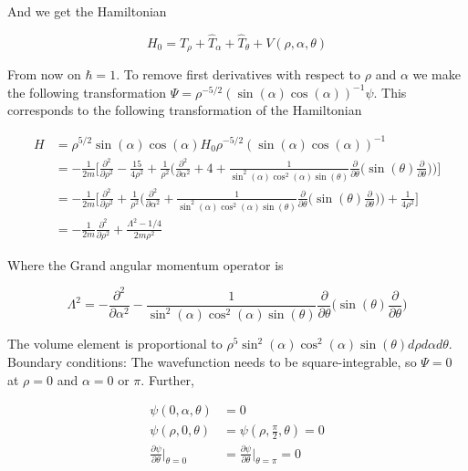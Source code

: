 \documentclass{article}
\begin{document}
And we get the Hamiltonian 

\begin{equation}
H_0 = \hat{T}_{\rho} +  \hat{T}_{\alpha}+\hat{T}_{\theta} + V(\rho,\alpha,\theta)
\end{equation}

From now on $\hbar = 1$. To remove first derivatives with respect to $\rho$ and $\alpha$ we make the following transformation $\Psi = \rho^{-5/2}(\sin(\alpha)\cos(\alpha))^{-1}\psi$. This corresponds to the following transformation of the Hamiltonian 

\begin{subequations}
\begin{align*}
	H &= \rho^{5/2}\sin(\alpha)\cos(\alpha) H_0 \rho^{-5/2}(\sin(\alpha)\cos(\alpha))^{-1}\\
	    &= -\frac{1}{2m} \Big[ \frac{\partial^2}{\partial\rho^2} - \frac{15}{4\rho^2} + \frac{1}{\rho^2}\Big( \frac{\partial^2}{\partial\alpha^2} + 4 + \frac{1}{\sin^2(\alpha)\cos^2(\alpha)\sin(\theta)} \frac{\partial}{\partial\theta} \Big( \sin(\theta) \frac{\partial}{\partial\theta} \Big) \Big) \Big]\\
	    &= -\frac{1}{2m} \Big[ \frac{\partial^2}{\partial\rho^2} + \frac{1}{\rho^2}\Big( \frac{\partial^2}{\partial\alpha^2} + \frac{1}{\sin^2(\alpha)\cos^2(\alpha)\sin(\theta)} \frac{\partial}{\partial\theta} \Big( \sin(\theta) \frac{\partial}{\partial\theta} \Big) \Big) + \frac{1}{4\rho^2} \Big]\\
	    &= -\frac{1}{2m}\frac{\partial^2}{\partial\rho^2} + \frac{\Lambda^2 - 1/4}{2m\rho^2}
\end{align*}   
\end{subequations}

Where the Grand angular momentum operator is

\begin{equation}
\Lambda^2 = -\frac{\partial^2}{\partial\alpha^2} - \frac{1}{\sin^2(\alpha)\cos^2(\alpha)\sin(\theta)} \frac{\partial}{\partial\theta} \Big( \sin(\theta) \frac{\partial}{\partial\theta}\Big)
\end{equation}

The volume element is proportional to $\rho^5\sin^2(\alpha)\cos^2(\alpha)\sin(\theta)d\rho d\alpha d\theta$. Boundary conditions:
The wavefunction needs to be square-integrable, so $\Psi = 0$ at $\rho=0$ and $\alpha = 0 $ or $\pi$. Further, 

\begin{subequations}
\begin{align*}
	\psi(0,\alpha,\theta) &= 0\\
	\psi(\rho,0,\theta)    &= \psi(\rho,\frac{\pi}{2},\theta) = 0\\
	\frac{\partial\psi}{\partial\theta}\bigg\rvert_{\theta = 0} &= \frac{\partial\psi}{\partial\theta}\bigg\rvert_{\theta = \pi} = 0
\end{align*}   
\end{subequations} 
\end{document}
